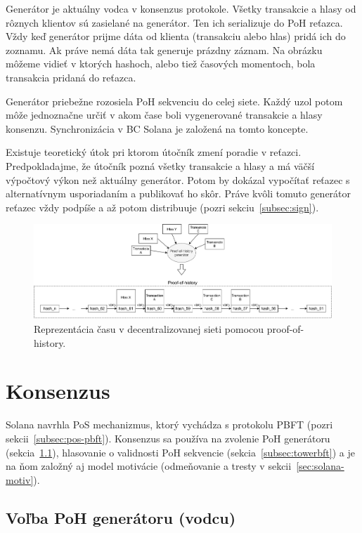 Generátor je aktuálny vodca v konsenzus protokole. Všetky transakcie a hlasy od rôznych klientov sú zasielané na generátor. Ten ich serializuje do PoH reťazca. Vždy keď generátor prijme dáta od klienta (transakciu alebo hlas) pridá ich do zoznamu. Ak práve nemá dáta tak generuje prázdny záznam. Na obrázku môžeme vidieť v ktorých hashoch, alebo tiež časových momentoch, bola transakcia pridaná do reťazca.

Generátor priebežne rozosiela PoH sekvenciu do celej siete. Každý uzol potom môže jednoznačne určiť v akom čase boli vygenerované transakcie a hlasy konsenzu. Synchronizácia v BC Solana je založená na tomto koncepte.

Existuje teoretický útok pri ktorom útočník zmení poradie v reťazci. Predpokladajme, že útočník pozná všetky transakcie a hlasy a má väčší výpočtový výkon než aktuálny generátor. Potom by dokázal vypočítať reťazec s alternatívnym usporiadaním a publikovať ho skôr. Práve kvôli tomuto generátor reťazec vždy podpíše a až potom distribuuje (pozri sekciu~\ref{subsec:sign}).

\begin{figure}[bt]
	\centering
	\includegraphics[width=\textwidth]{obrazky-figures/solana-poh-time}
	\caption{Reprezentácia času v decentralizovanej sieti pomocou proof-of-history.}
	\label{img:solana-poh}
\end{figure}

\section{Konsenzus}\label{sec:solana-consens}

Solana navrhla PoS mechanizmus, ktorý vychádza s protokolu PBFT (pozri sekcii~\ref{subsec:pos-pbft}). Konsenzus sa používa na zvolenie PoH generátoru (sekcia~\ref{subsec:pos-generator}), hlasovanie o validnosti PoH sekvencie (sekcia~\ref{subsec:towerbft}) a je na ňom založný aj model motivácie (odmeňovanie a tresty v sekcii~\ref{sec:solana-motiv}).

\subsection{Voľba PoH generátoru (vodcu)}\label{subsec:pos-generator}

